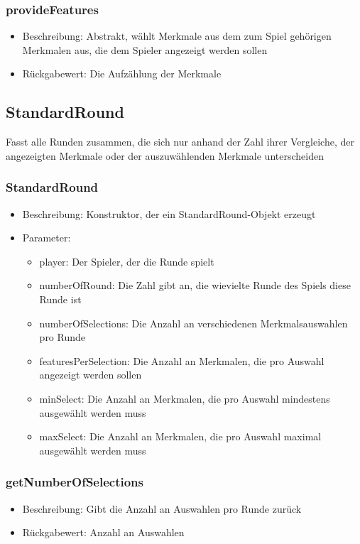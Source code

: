 \documentclass[a4paper]{scrreprt}
\begin{document}
	\subsubsection{provideFeatures}
				\begin{itemize}
					\item Beschreibung: Abstrakt, wählt Merkmale aus dem zum Spiel gehörigen Merkmalen aus, die dem Spieler angezeigt werden sollen
					\item Rückgabewert: Die Aufzählung der Merkmale
				\end{itemize}

	\subsection{StandardRound}
	Fasst alle Runden zusammen, die sich nur anhand der Zahl ihrer Vergleiche, der angezeigten Merkmale oder der auszuwählenden Merkmale unterscheiden
	\subsubsection{StandardRound}
	\begin{itemize}
	\item Beschreibung: Konstruktor, der ein StandardRound-Objekt erzeugt
	\item Parameter: 
	\begin{itemize}
	\item player: Der Spieler, der die Runde spielt
	\item numberOfRound: Die Zahl gibt an, die wievielte Runde des Spiels diese Runde ist
	\item numberOfSelections: Die Anzahl an verschiedenen Merkmalsauswahlen pro Runde
	\item featuresPerSelection: Die Anzahl an Merkmalen, die pro Auswahl angezeigt werden sollen
	\item minSelect: Die Anzahl an Merkmalen, die pro Auswahl mindestens ausgewählt werden muss
	\item maxSelect: Die Anzahl an Merkmalen, die pro Auswahl maximal ausgewählt werden muss
	\end{itemize}
	\end{itemize}
	\subsubsection{getNumberOfSelections}
	\begin{itemize}
		\item Beschreibung: Gibt die Anzahl an Auswahlen pro Runde zurück
		\item Rückgabewert: Anzahl an Auswahlen
	\end{itemize}
\end{document}
